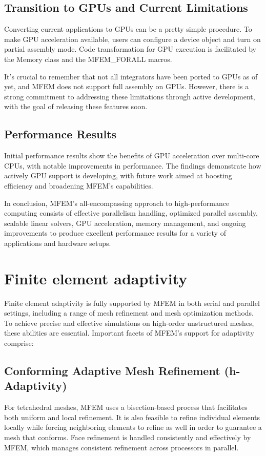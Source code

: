 \documentclass{article}
\begin{document}
\subsection{Transition to GPUs and Current Limitations}
Converting current applications to GPUs can be a pretty simple procedure. To make GPU acceleration available, users can configure a device object and turn on partial assembly mode. Code transformation for GPU execution is facilitated by the Memory class and the MFEM\_FORALL macros.

It's crucial to remember that not all integrators have been ported to GPUs as of yet, and MFEM does not support full assembly on GPUs. However, there is a strong commitment to addressing these limitations through active development, with the goal of releasing these features soon.
\subsection{Performance Results}
Initial performance results show the benefits of GPU acceleration over multi-core CPUs, with notable improvements in performance. The findings demonstrate how actively GPU support is developing, with future work aimed at boosting efficiency and broadening MFEM's capabilities.

In conclusion, MFEM's all-encompassing approach to high-performance computing consists of effective parallelism handling, optimized parallel assembly, scalable linear solvers, GPU acceleration, memory management, and ongoing improvements to produce excellent performance results for a variety of applications and hardware setups.

\section{Finite element adaptivity}
Finite element adaptivity is fully supported by MFEM in both serial and parallel settings, including a range of mesh refinement and mesh optimization methods. To achieve precise and effective simulations on high-order unstructured meshes, these abilities are essential. Important facets of MFEM's support for adaptivity comprise:

\subsection{Conforming Adaptive Mesh Refinement (h-Adaptivity)} For tetrahedral meshes, MFEM uses a bisection-based process that facilitates both uniform and local refinement. It is also feasible to refine individual elements locally while forcing neighboring elements to refine as well in order to guarantee a mesh that conforms. Face refinement is handled consistently and effectively by MFEM, which manages consistent refinement across processors in parallel.
\end{document}
